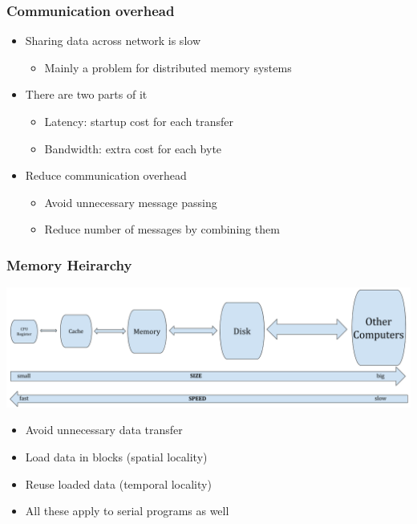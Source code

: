 \documentclass[10pt,t]{beamer}
\begin{document}
\begin{frame}
\frametitle{Communication overhead}
\begin{itemize}
\item Sharing data across network is slow
\begin{itemize}
\item Mainly a problem for distributed memory systems
\end{itemize}
\item There are two parts of it
\begin{itemize}
\item Latency: startup cost for each transfer
\item Bandwidth: extra cost for each byte
\end{itemize}
\item Reduce communication overhead
\begin{itemize}
\item Avoid unnecessary message passing
\item Reduce number of messages by combining them
\end{itemize}
\end{itemize}
\end{frame}

\begin{frame}
\frametitle{Memory Heirarchy}
\includegraphics[width=\textwidth]{./MemHier}
\begin{itemize}
\item Avoid unnecessary data transfer
\item Load data in blocks (spatial locality)
\item Reuse loaded data (temporal locality)
\item All these apply to serial programs as well
\end{itemize}
\end{frame}
\end{document}
